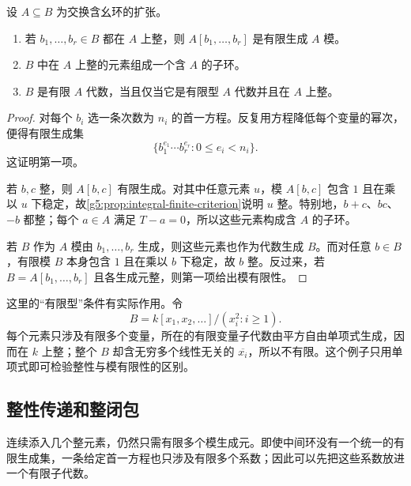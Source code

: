 \begin{proposition}
\label{g5:prop:integral-elements-subring}
	设 \(A\subseteq B\) 为交换含幺环的扩张。
	\begin{enumerate}
		\item 若 \(b_1,\ldots,b_r\in B\) 都在 \(A\) 上整，则 \(A[b_1,\ldots,b_r]\) 是有限生成 \(A\) 模。
		\item \(B\) 中在 \(A\) 上整的元素组成一个含 \(A\) 的子环。
		\item \(B\) 是有限 \(A\) 代数，当且仅当它是有限型 \(A\) 代数并且在 \(A\) 上整。
	\end{enumerate}
\end{proposition}
\begin{proof}
	对每个 \(b_i\) 选一条次数为 \(n_i\) 的首一方程。反复用方程降低每个变量的幂次，便得有限生成集
	\[
		\bigl\{b_1^{e_1}\cdots b_r^{e_r}:0\leq e_i<n_i\bigr\}.
	\]
	这证明第一项。

	若 \(b,c\) 整，则 \(A[b,c]\) 有限生成。对其中任意元素 \(u\)，模 \(A[b,c]\) 包含 \(1\) 且在乘以 \(u\) 下稳定，故\cref{g5:prop:integral-finite-criterion}说明 \(u\) 整。特别地，\(b+c\)、\(bc\)、\(-b\) 都整；每个 \(a\in A\) 满足 \(T-a=0\)，所以这些元素构成含 \(A\) 的子环。

	若 \(B\) 作为 \(A\) 模由 \(b_1,\ldots,b_r\) 生成，则这些元素也作为代数生成 \(B\)。而对任意 \(b\in B\)，有限模 \(B\) 本身包含 \(1\) 且在乘以 \(b\) 下稳定，故 \(b\) 整。反过来，若 \(B=A[b_1,\ldots,b_r]\) 且各生成元整，则第一项给出模有限性。
\end{proof}

这里的“有限型”条件有实际作用。令
\[
	B=k[x_1,x_2,\ldots]/(x_i^2:i\geq1).
\]
每个元素只涉及有限多个变量，所在的有限变量子代数由平方自由单项式生成，因而在 \(k\) 上整；整个 \(B\) 却含无穷多个线性无关的 \(\overline{x_i}\)，所以不有限。这个例子只用单项式即可检验整性与模有限性的区别。

\subsection{整性传递和整闭包}
\label{g5:subsec:0301:02}

连续添入几个整元素，仍然只需有限多个模生成元。即使中间环没有一个统一的有限生成集，一条给定首一方程也只涉及有限多个系数；因此可以先把这些系数放进一个有限子代数。

